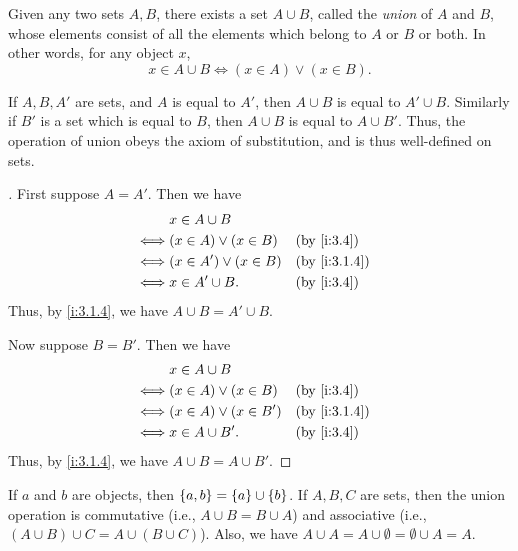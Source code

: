 \begin{ax}\label{i:3.4}
  Given any two sets \(A, B\), there exists a set \(A \cup B\), called the \emph{union} of \(A\) and \(B\), whose elements consist of all the elements which belong to \(A\) or \(B\) or both.
  In other words, for any object \(x\),
  \[
    x \in A \cup B \iff (x \in A) \lor (x \in B).
  \]
\end{ax}

\setcounter{thm}{11}
\begin{rmk}\label{i:3.1.12}
  If \(A, B, A'\) are sets, and \(A\) is equal to \(A'\), then \(A \cup B\) is equal to \(A' \cup B\).
  Similarly if \(B'\) is a set which is equal to \(B\), then \(A \cup B\) is equal to \(A \cup B'\).
  Thus, the operation of union obeys the axiom of substitution, and is thus well-defined on sets.
\end{rmk}

\begin{proof}[]
  First suppose \(A = A'\).
  Then we have
  \begin{align*}
         & x \in A \cup B                              \\
    \iff & (x \in A) \lor (x \in B)  &  & \by{i:3.4}   \\
    \iff & (x \in A') \lor (x \in B) &  & \by{i:3.1.4} \\
    \iff & x \in A' \cup B.          &  & \by{i:3.4}
  \end{align*}
  Thus, by \cref{i:3.1.4}, we have \(A \cup B = A' \cup B\).

  Now suppose \(B = B'\).
  Then we have
  \begin{align*}
         & x \in A \cup B                              \\
    \iff & (x \in A) \lor (x \in B)  &  & \by{i:3.4}   \\
    \iff & (x \in A) \lor (x \in B') &  & \by{i:3.1.4} \\
    \iff & x \in A \cup B'.          &  & \by{i:3.4}
  \end{align*}
  Thus, by \cref{i:3.1.4}, we have \(A \cup B = A \cup B'\).
\end{proof}

\begin{lem}\label{i:3.1.13}
  If \(a\) and \(b\) are objects, then \(\left\lbrace a, b\right\rbrace = \left\lbrace a\right\rbrace \cup \left\lbrace b\right\rbrace\).
  If \(A, B, C\) are sets, then the union operation is commutative (i.e., \(A \cup B = B \cup A\)) and associative (i.e., \((A \cup B) \cup C = A \cup (B \cup C)\)).
  Also, we have \(A \cup A = A \cup \emptyset = \emptyset \cup A = A\).
\end{lem}

